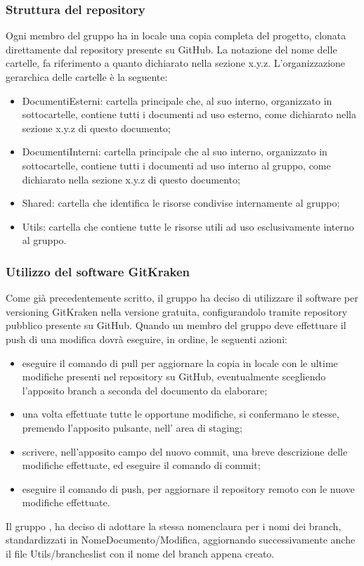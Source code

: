 \subsubsection{Struttura del repository}
Ogni membro del gruppo {\Gruppo} ha in locale una copia completa del progetto, clonata direttamente dal repository presente su GitHub. La notazione del nome delle cartelle, fa riferimento a quanto dichiarato nella sezione x.y.z. L’organizzazione gerarchica delle cartelle è la seguente:
\begin{itemize}
	\item DocumentiEsterni: cartella principale che, al suo interno, organizzato in sottocartelle, contiene tutti i documenti ad uso esterno, come dichiarato nella sezione x.y.z di questo documento;
	\item DocumentiInterni: cartella principale che al suo interno, organizzato in sottocartelle, contiene tutti i documenti ad uso interno al gruppo, come dichiarato nella sezione x.y.z di questo documento;
	\item Shared: cartella che identifica le risorse condivise internamente al gruppo;
	\item Utils: cartella che contiene tutte le risorse utili ad uso esclusivamente interno al gruppo.
\end{itemize}

\subsubsection{Utilizzo del software GitKraken}
Come già precedentemente scritto, il gruppo {\Gruppo} ha deciso di utilizzare il software per versioning GitKraken nella versione gratuita, configurandolo tramite repository pubblico presente su GitHub. Quando un membro del gruppo deve effettuare il push di una modifica dovrà eseguire, in ordine, le seguenti azioni:
\begin{itemize}
	\item eseguire il comando di pull per aggiornare la copia in locale con le ultime modifiche presenti nel repository su GitHub, eventualmente scegliendo l’apposito branch a seconda del documento da elaborare;
	\item una volta effettuate tutte le opportune modifiche, si confermano le stesse, premendo l’apposito pulsante, nell’ area di staging;
	\item scrivere, nell’apposito campo del nuovo commit, una breve descrizione delle modifiche effettuate, ed eseguire il comando di commit;
	\item eseguire il comando di push, per aggiornare il repository remoto con le nuove modifiche effettuate.
\end{itemize}
Il gruppo {\Gruppo}, ha deciso di adottare la stessa nomenclaura per i nomi dei branch, standardizzati in NomeDocumento/Modifica, aggiornando successivamente anche il file Utils/brancheslist con il nome del branch appena creato.

